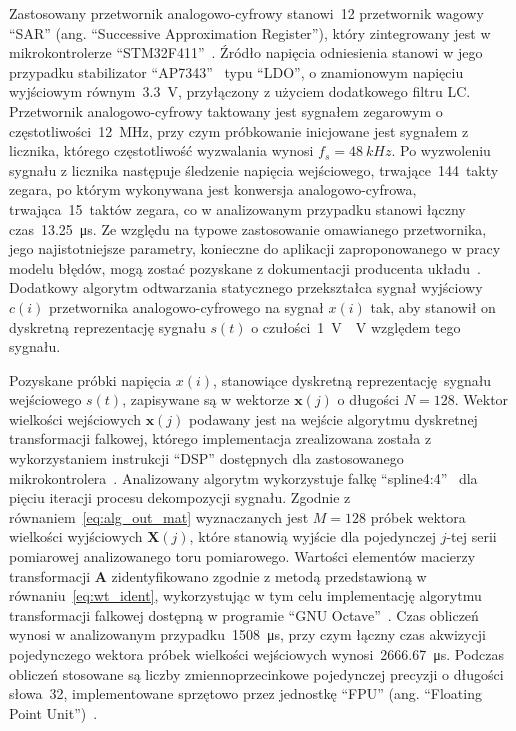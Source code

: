 Zastosowany przetwornik analogowo-cyfrowy stanowi~\qty{12}{\bitOwy} przetwornik wagowy \enquote{SAR} (ang. \enquote{Successive Approximation Register}), który zintegrowany jest w mikrokontrolerze \enquote{STM32F411}~\cite{stm_f411}. Źródło napięcia odniesienia stanowi w jego przypadku stabilizator \enquote{AP7343}~\cite{diodes_manual} typu \enquote{LDO}, o znamionowym napięciu wyjściowym równym~\qty{3.3}{V}, przyłączony z użyciem dodatkowego filtru LC. Przetwornik analogowo-cyfrowy taktowany jest sygnałem zegarowym o częstotliwości~\qty{12}{MHz}, przy czym próbkowanie inicjowane jest sygnałem z licznika, którego częstotliwość wyzwalania wynosi $f_{s} = \qty{48}{kHz}$. Po wyzwoleniu sygnału z licznika następuje śledzenie napięcia wejściowego, trwające~\qty{144}{takty} zegara, po którym wykonywana jest konwersja analogowo-cyfrowa, trwająca~\qty{15}{taktów} zegara, co w analizowanym przypadku stanowi łączny czas~\qty{13.25}{\micro s}. Ze względu na typowe zastosowanie omawianego przetwornika, jego najistotniejsze parametry, konieczne do aplikacji zaproponowanego w pracy modelu błędów, mogą zostać pozyskane z dokumentacji producenta układu~\cite{stm_f411}. Dodatkowy algorytm odtwarzania statycznego przekształca sygnał wyjściowy $c(i)$ przetwornika analogowo-cyfrowego na sygnał $x(i)$ tak, aby stanowił on dyskretną reprezentację sygnału $s(t)$ o czułości~\qty{1}{V \per V} względem tego sygnału.

Pozyskane próbki napięcia $x(i)$, stanowiące dyskretną reprezentację sygnału wejściowego $s(t)$, zapisywane są w wektorze $\mathbf{x}(j)$ o długości $N = 128$. Wektor wielkości wejściowych $\mathbf{x}(j)$ podawany jest na wejście algorytmu dyskretnej transformacji falkowej, którego implementacja zrealizowana została z wykorzystaniem instrukcji \enquote{DSP} dostępnych dla zastosowanego mikrokontrolera~\cite{cortex_dsp, reay_dsp}. Analizowany algorytm wykorzystuje falkę \enquote{spline4:4}~\cite{wang_splinebasics} dla pięciu iteracji procesu dekompozycji sygnału. Zgodnie z równaniem~\eqref{eq:alg_out_mat} wyznaczanych jest $M = 128$ próbek wektora wielkości wyjściowych $\mathbf{X}(j)$, które stanowią wyjście dla pojedynczej $j$-tej serii pomiarowej analizowanego toru pomiarowego. Wartości elementów macierzy transformacji $\mathbf{A}$ zidentyfikowano zgodnie z metodą przedstawioną w równaniu~\eqref{eq:wt_ident}, wykorzystując w tym celu implementację algorytmu transformacji falkowej dostępną w programie \enquote{GNU Octave}~\cite{pruuvsa_dwt}. Czas obliczeń wynosi w analizowanym przypadku~\qty{1508}{\micro s}, przy czym łączny czas akwizycji pojedynczego wektora próbek wielkości wejściowych wynosi~\qty{2666.67}{\micro s}. Podczas obliczeń stosowane są liczby zmiennoprzecinkowe pojedynczej precyzji o długości słowa~\qty{32}{\bitOw}, implementowane sprzętowo przez jednostkę \enquote{FPU} (ang. \enquote{Floating Point Unit})~\cite{cortex_fpu, gcc_manual}.

